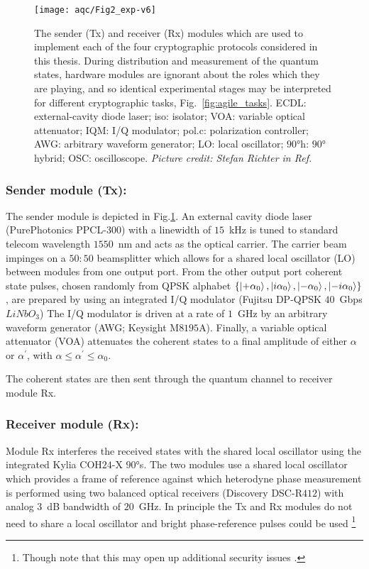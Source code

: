 \begin{figure}[htp]
\centering
\texttt{[image: aqc/Fig2\_exp-v6]}
\caption{\label{fig:aqc_experiment} The sender (Tx) and receiver (Rx) modules which are used to implement each of the four cryptographic protocols considered in this thesis. During distribution and measurement of the quantum states, hardware modules are ignorant about the roles which they are playing, and so identical experimental stages may be interpreted for different cryptographic tasks, Fig.~\ref{fig:agile_tasks}. ECDL: external-cavity diode laser; iso: isolator; VOA: variable optical attenuator; IQM: I/Q modulator; pol.c: polarization controller; AWG: arbitrary waveform generator; LO: local oscillator; $90\si{\degree}$h: $90\si{\degree}$ hybrid; OSC: oscilloscope. \emph{Picture credit: Stefan Richter in Ref.~\cite{Richter2020}}}
\end{figure}

\subsubsection{Sender module (Tx):} The sender module is depicted in Fig.\ref{fig:aqc_experiment}. An external cavity diode laser (PurePhotonics PPCL-$300$) with a linewidth of $15$~kHz is tuned to standard telecom wavelength $1550$~nm and acts as the optical carrier. The carrier beam impinges on a $50:50$ beamsplitter which allows for a shared local oscillator (LO) between modules from one output port. From the other output port  coherent state pulses, chosen randomly from QPSK alphabet $\left\{ \ket{+ \alpha_0}, \ket{i \alpha_0}, \ket{-\alpha_0}, \ket{-i \alpha_0}\right\}$, are prepared by using an integrated I/Q modulator (Fujitsu DP-QPSK $40$~Gbps $LiNbO_3$)%
The I/Q modulator is driven at a rate of $1$~GHz by an arbitrary waveform generator (AWG; Keysight M$8195$A). Finally, a variable optical attenuator (VOA) attenuates the coherent states to a final amplitude of either $\alpha$ or $\alpha^\prime$, with $\alpha \le \alpha^\prime \le \alpha_0$.

The coherent states are then sent through the quantum channel to receiver module Rx.

\subsubsection{Receiver module (Rx):}
Module Rx interferes the received states with the shared local oscillator using the integrated Kylia COH$24$-X $90\si{\degree}$s. The two modules use a shared local oscillator which provides a frame of reference against which heterodyne phase measurement is performed using two balanced optical receivers (Discovery DSC-R$412$) with analog $3$~dB bandwidth of $20$~GHz. In principle the Tx and Rx modules do not need to share a local oscillator and bright phase-reference pulses could be used \cite{Huang2015}\footnote{Though note that this may open up additional security issues \cite{Ren2019}.}

